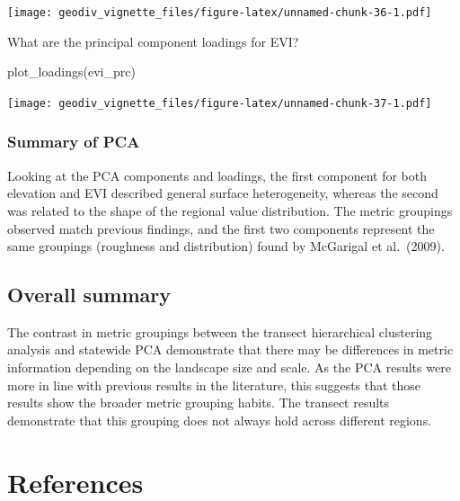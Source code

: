 \documentclass[
]{article}
\newenvironment{Shaded}{\begin{snugshade}}{\end{snugshade}}
\newcommand{\FunctionTok}[1]{\textcolor[rgb]{0.00,0.00,0.00}{#1}}
\newcommand{\NormalTok}[1]{#1}
\begin{document}
\texttt{[image: geodiv\_vignette\_files/figure-latex/unnamed-chunk-36-1.pdf]}

What are the principal component loadings for EVI?

\begin{Shaded}
\begin{Highlighting}[]
\FunctionTok{plot\_loadings}\NormalTok{(evi\_prc)}
\end{Highlighting}
\end{Shaded}

\texttt{[image: geodiv\_vignette\_files/figure-latex/unnamed-chunk-37-1.pdf]}

\hypertarget{summary-of-pca}{%
\subsubsection{Summary of PCA}\label{summary-of-pca}}

Looking at the PCA components and loadings, the first component for both
elevation and EVI described general surface heterogeneity, whereas the
second was related to the shape of the regional value distribution. The
metric groupings observed match previous findings, and the first two
components represent the same groupings (roughness and distribution)
found by McGarigal et al.~(2009).

\hypertarget{overall-summary}{%
\subsection{Overall summary}\label{overall-summary}}

The contrast in metric groupings between the transect hierarchical
clustering analysis and statewide PCA demonstrate that there may be
differences in metric information depending on the landscape size and
scale. As the PCA results were more in line with previous results in the
literature, this suggests that those results show the broader metric
grouping habits. The transect results demonstrate that this grouping
does not always hold across different regions.

\hypertarget{references}{%
\section{References}\label{references}}
\end{document}

